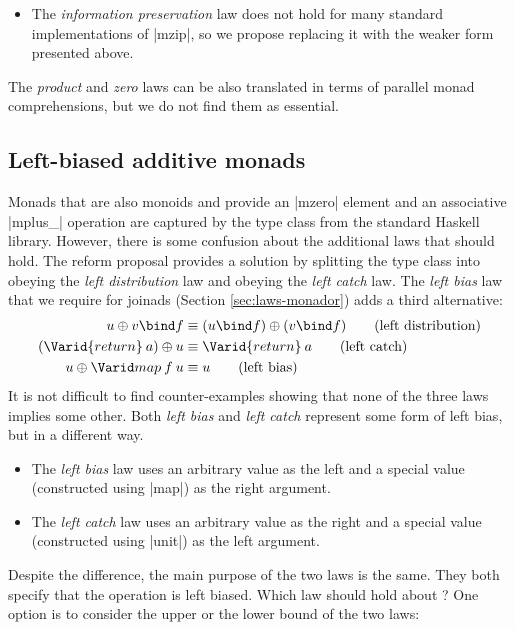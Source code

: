 \documentclass{sigplanconf}
\begin{document}
\begin{itemize}
\item The \textit{information preservation} law does not hold for many standard implementations of 
  |mzip|, so we propose replacing it with the weaker form presented above.

%
\end{itemize}
The \textit{product} and \textit{zero} laws can be also translated in terms of parallel
monad comprehensions, but we do not find them as essential.


\subsection{Left-biased additive monads}
\label{sec:proposals-morelse}

Monads that are also monoids and provide an |mzero| element and an associative |mplus_|
operation are captured by the  type class from the standard Haskell library. 
However, there is some confusion about the additional laws that should hold. The  
reform proposal \cite{monadplusreform} provides a solution by splitting the type class into  
obeying the \textit{left distribution} law and  obeying the \textit{left catch} law. The
\textit{left bias} law that we require for joinads (Section \ref{sec:laws-monador}) adds a third
alternative:
\begin{align*}
  u \mplus v \bind f &\equiv (u \bind f) \mplus (v \bind f) \tag{left distribution}\\
  (\Varid{return} \: a) \mplus u &\equiv \Varid{return} \: a \tag{left catch} \\
  u \morelse \map \: f \: u &\equiv u \tag{left bias}
\end{align*}
It is not difficult to find counter-examples showing that none of the three laws implies some other.
Both \textit{left bias} and \textit{left catch} represent some form of left bias, but in a 
different way. 

\begin{itemize}
\item The \textit{left bias} law uses an arbitrary value as the left
  and a special value (constructed using |map|) as the right argument. 

\item The \textit{left catch} law uses an arbitrary value as the right 
  and a special value (constructed using |unit|) as the left argument. 
\end{itemize}
Despite the difference, the main purpose of the two laws is the same. They both specify that the 
operation is left biased. Which law should hold about ? One option is to consider 
the upper or the lower bound of the two laws:
\end{document}

